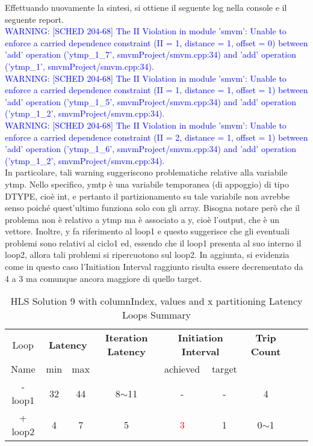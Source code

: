 

Effettuando nuovamente la sintesi, si ottiene il seguente log nella console e il seguente report.
\\
\textcolor{blue}{WARNING: [SCHED 204-68] The II Violation in module 'smvm': Unable to enforce a carried dependence constraint (II = 1, distance = 1, offset = 0)
	between 'add' operation ('ytmp\_1\_7', smvmProject/smvm.cpp:34) and 'add' operation ('ytmp\_1', smvmProject/smvm.cpp:34).}
\\
\textcolor{blue}{WARNING: [SCHED 204-68] The II Violation in module 'smvm': Unable to enforce a carried dependence constraint (II = 1, distance = 1, offset = 1)
	between 'add' operation ('ytmp\_1\_5', smvmProject/smvm.cpp:34) and 'add' operation ('ytmp\_1\_2', smvmProject/smvm.cpp:34).}
\\
\textcolor{blue}{WARNING: [SCHED 204-68] The II Violation in module 'smvm': Unable to enforce a carried dependence constraint (II = 2, distance = 1, offset = 1)
	between 'add' operation ('ytmp\_1\_6', smvmProject/smvm.cpp:34) and 'add' operation ('ytmp\_1\_2', smvmProject/smvm.cpp:34).}
\\

In particolare, tali warning suggeriscono problematiche relative alla variabile ytmp. Nello specifico, ymtp è una variabile temporanea (di appoggio) di tipo DTYPE, cioè int, e pertanto il partizionamento su tale variabile non avrebbe senso poiché quest'ultimo funziona solo con gli array. Bisogna notare però che il problema non è relativo a ytmp ma è associato a y, cioè l'output, che è un vettore. Inoltre, y fa riferimento al loop1 e questo suggerisce che gli eventuali problemi sono relativi al ciclo1 ed, essendo che il loop1 presenta al suo interno il loop2, allora tali problemi si ripercuotono sul loop2. In aggiunta, si evidenzia come in questo caso l'Initiation Interval raggiunto risulta essere decrementato da 4 a 3 ma comunque ancora maggiore di quello target. 

\begin{table}[H]
	\centering
	\begin{tabular}{|c|c|c|c|c|c|c|c|c|}
		\hline
		\multicolumn{1}{|c|}{Loop} & \multicolumn{2}{|c|}{\textbf{Latency}} & \multicolumn{1}{c|}{\textbf{Iteration Latency}} & \multicolumn{2}{c|}{\textbf{Initiation Interval}} & \multicolumn{1}{c|}{\textbf{Trip Count}}  \\
		Name & min & max &  & achieved & target &  \\
		\hline
		- loop1 & 32 & 44 & 8$\sim$11 & - & - & 4 \\
		+ loop2 & 4 & 7 & 5 & \textcolor{red}{3} & 1 & 0$\sim$1 \\
		\hline
	\end{tabular}
	\caption{HLS Solution 9 with columnIndex, values and x partitioning Latency Loops Summary}
	\label{tab:hls-solution-9-columnindex-values-partitioning-loop-summary}
\end{table}


